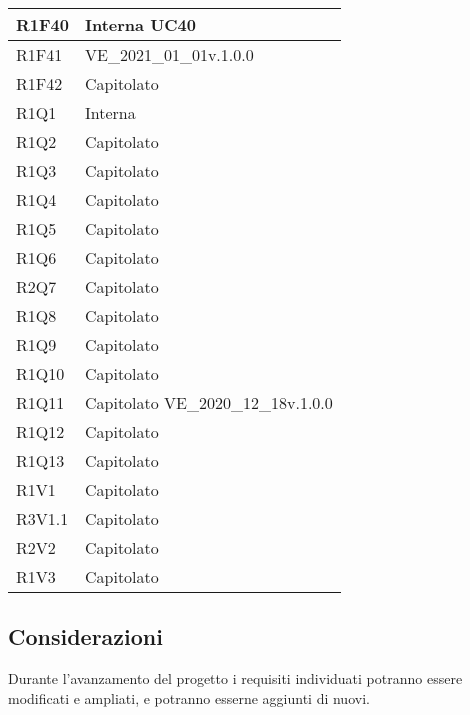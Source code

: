 \begin{center}
\begin{longtable}{|p{22mm}|p{44mm}|}
R1F40 &
Interna \newline
UC40 
\\
\hline

R1F41 &
VE\_2021\_01\_01v.1.0.0 
\\
\hline

R1F42 &
Capitolato 
\\
\hline

 R1Q1 &
Interna 
\\
\hline

R1Q2 &
Capitolato 
\\
\hline

R1Q3 &
Capitolato 
\\
\hline

R1Q4 &
Capitolato 
\\
\hline

R1Q5 &
Capitolato 
\\
\hline

R1Q6 &
Capitolato 
\\
\hline

R2Q7 &
Capitolato 
\\
\hline

R1Q8 &
Capitolato 
\\
\hline

R1Q9 &
Capitolato 
\\
\hline

R1Q10 &
Capitolato 
\\
\hline

R1Q11 &
Capitolato \newline
VE\_2020\_12\_18v.1.0.0 
\\
\hline

R1Q12 &
Capitolato 
\\
\hline

R1Q13 &
Capitolato 
\\
\hline

 R1V1 &
Capitolato 
\\
\hline

R3V1.1 &
Capitolato 
\\
\hline

R2V2 &
Capitolato 
\\
\hline

R1V3 &
Capitolato 
\\
\hline%
	
	\end{longtable}
\end{center}

\subsection{Considerazioni}
Durante l'avanzamento del progetto i requisiti individuati potranno essere modificati e ampliati, e potranno esserne aggiunti di nuovi.